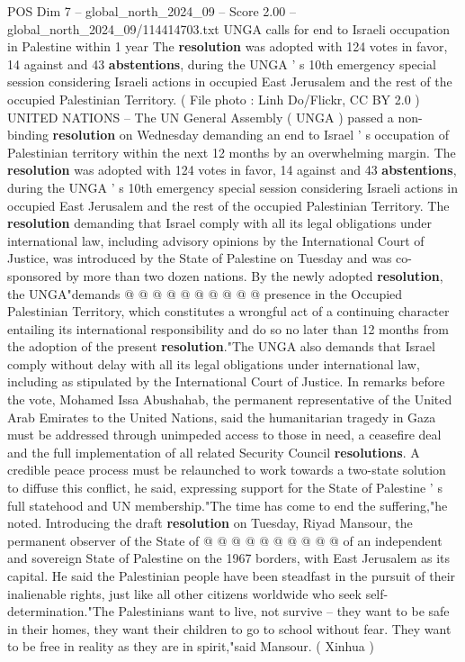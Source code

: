 \begin{textsample}{POS Dim 7 – global\_north\_2024\_09 – Score 2.00 – global\_north\_2024\_09/114414703.txt}  \label{ex:f7_pos_433}
UNGA calls for end to Israeli occupation in Palestine within 1 year The \textbf{resolution} was adopted with 124 votes in favor, 14 against and 43 \textbf{abstentions}, during the UNGA ' s 10th emergency special session considering Israeli actions in occupied East Jerusalem and the rest of the occupied Palestinian Territory. ( File photo : Linh Do/Flickr, CC BY 2.0 ) UNITED NATIONS -- The UN General Assembly ( UNGA ) passed a non-binding \textbf{resolution} on Wednesday demanding an end to Israel ' s occupation of Palestinian territory within the next 12 months by an overwhelming margin.
The \textbf{resolution} was adopted with 124 votes in favor, 14 against and 43 \textbf{abstentions}, during the UNGA ' s 10th emergency special session considering Israeli actions in occupied East Jerusalem and the rest of the occupied Palestinian Territory.
The \textbf{resolution} demanding that Israel comply with all its legal obligations under international law, including advisory opinions by the International Court of Justice, was introduced by the State of Palestine on Tuesday and was co-sponsored by more than two dozen nations.
By the newly adopted \textbf{resolution}, the UNGA"demands @ @ @ @ @ @ @ @ @ @ presence in the Occupied Palestinian Territory, which constitutes a wrongful act of a continuing character entailing its international responsibility and do so no later than 12 months from the adoption of the present \textbf{resolution}."The UNGA also demands that Israel comply without delay with all its legal obligations under international law, including as stipulated by the International Court of Justice.
In remarks before the vote, Mohamed Issa Abushahab, the permanent representative of the United Arab Emirates to the United Nations, said the humanitarian tragedy in Gaza must be addressed through unimpeded access to those in need, a ceasefire deal and the full implementation of all related Security Council \textbf{resolutions}.
A credible peace process must be relaunched to work towards a two-state solution to diffuse this conflict, he said, expressing support for the State of Palestine ' s full statehood and UN membership."The time has come to end the suffering,"he noted.
Introducing the draft \textbf{resolution} on Tuesday, Riyad Mansour, the permanent observer of the State of @ @ @ @ @ @ @ @ @ @ of an independent and sovereign State of Palestine on the 1967 borders, with East Jerusalem as its capital.
He said the Palestinian people have been steadfast in the pursuit of their inalienable rights, just like all other citizens worldwide who seek self-determination."The Palestinians want to live, not survive -- they want to be safe in their homes, they want their children to go to school without fear.
They want to be free in reality as they are in spirit,"said Mansour. ( Xinhua )

\end{textsample}
